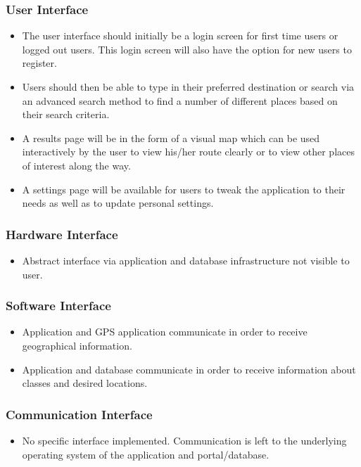 \documentclass{article}
\begin{document}
 		\subsubsection{User Interface}
 		\begin{itemize}
 		\item The user interface should initially be a login screen for first time users or logged out users. This login screen will also have the option for new users to register.
 		\item Users should then be able to type in their preferred destination or search via an advanced search method to find a number of different places based on their search criteria.
 		\item A results page will be in the form of a visual map which can be used interactively by the user to view his/her route clearly or to view other places of interest along the way.
 		\item A settings page will be available for users to tweak the application to their needs as well as to update personal settings.\newline
 		\end{itemize}
 		
 		\subsubsection{Hardware Interface}
 		\begin{itemize}
 		\item Abstract interface via application and database infrastructure not visible to user.\newline
 		\end{itemize}
 		
 		\subsubsection{Software Interface}
 		\begin{itemize}
 		\item Application and GPS application communicate in order to receive geographical information. 			\item Application and database communicate in order to receive information about classes and desired locations.\newline
 		\end{itemize}
 		
 		\subsubsection{Communication Interface}
 		\begin{itemize}
 		\item No specific interface implemented. Communication is left to the underlying operating system of the application and portal/database.\newline
 		\end{itemize}
 
\end{document}
